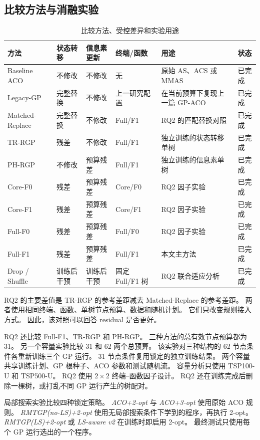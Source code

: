 \documentclass[letterpaper,journal]{IEEEtran}
\begin{document}
\subsection{比较方法与消融实验}

\begin{table}[t]
\caption{比较方法、受控差异和实验用途}
\label{tab:methods-zh}
\centering
\footnotesize
\renewcommand{\arraystretch}{1.13}
\begin{tabular}{L{20mm}L{24mm}L{25mm}L{23mm}L{48mm}L{16mm}}
\toprule
方法 & 状态转移 & 信息素更新 & 终端/函数 & 用途 & 状态\\
\midrule
Baseline ACO & 不修改 & 不修改 & 无 & 原始 AS、ACS 或 MMAS & 已完成\\
Legacy-GP & 完整替换 & 不修改 & 上一研究配置 & 在当前预算下复现上一篇 GP-ACO & 已完成\\
Matched-Replace & 完整替换 & 不修改 & Full/F1 & RQ2 的匹配替换对照 & 已完成\\
TR-RGP & 残差 & 不修改 & Full/F1 & 独立训练的状态转移单树 & 已完成\\
PH-RGP & 不修改 & 预算残差 & Full/F1 & 独立训练的信息素单树 & 已完成\\
Core-F0 & 残差 & 预算残差 & Core/F0 & RQ2 因子实验 & 已完成\\
Core-F1 & 残差 & 预算残差 & Core/F1 & RQ2 因子实验 & 已完成\\
Full-F0 & 残差 & 预算残差 & Full/F0 & RQ2 因子实验 & 已完成\\
Full-F1 & 残差 & 预算残差 & Full/F1 & 本文主方法 & 已完成\\
Drop / Shuffle & 训练后干预 & 训练后干预 & 固定 Full/F1 树 & RQ2 联合适应分析 & 已完成\\
\bottomrule
\end{tabular}
\end{table}

RQ2 的主要差值是 TR-RGP 的参考差距减去 Matched-Replace 的参考差距。
两者使用相同终端、函数、单树节点预算、数据和随机计划。
它们只改变规则接入方式。
因此，该对照可以回答 residual 是否更好。

RQ2 还比较 Full-F1、TR-RGP 和 PH-RGP。
三种方法的总有效节点预算都为 31。
另一个容量实验比较 31 和 62 两个总预算。
该实验对三种结构的 62 节点条件各重新训练三个 GP 运行。
31 节点条件复用锁定的独立训练结果。
两个容量共享训练计划、GP 根种子、ACO 参数和测试随机流。
容量分析只使用 TSP100-U 和 TSP500-U。
RQ2 使用 \(2\times2\) 终端--函数因子设计。
RQ2 还在训练完成后删除一棵树，或打乱不同 GP 运行产生的树配对。

局部搜索实验比较四种锁定策略。
\emph{ACO+2-opt} 与 \emph{ACO+3-opt} 使用原始 ACO 规则。
\emph{RMTGP(no-LS)+2-opt} 使用无局部搜索条件下学到的程序，再执行 2-opt。
\emph{RMTGP(LS)+2-opt} 或 \emph{LS-aware v2} 在训练时即启用 2-opt。
最终测试只使用每个 GP 运行选出的一个程序。
\end{document}
